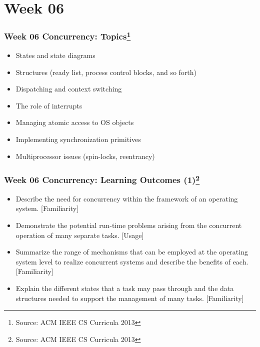 
\section{Week 06}
\begin{frame}[fragile]
\frametitle{Week 06 Concurrency:
Topics\footnote{Source: ACM IEEE CS Curricula 2013}}

\begin{itemize}
\item States and state diagrams 
\item Structures (ready list, process control blocks, and so forth) 
\item Dispatching and context switching 
\item The role of interrupts 
\item Managing atomic access to OS objects 
\item Implementing synchronization primitives 
\item Multiprocessor issues (spin-locks, reentrancy)  
\end{itemize}
\end{frame}

\begin{frame}[fragile]
\frametitle{Week 06 Concurrency:
Learning Outcomes (1)\footnote{Source: ACM IEEE CS Curricula 2013}}
\begin{itemize}
\item Describe the need for concurrency within the framework of an operating system. [Familiarity] 
\item Demonstrate the potential run-time problems arising from the concurrent operation of many separate tasks. [Usage] 
\item Summarize the range of mechanisms that can be employed at the operating system level to realize concurrent systems and describe the benefits of each. [Familiarity] 
\item Explain the different states that a task may pass through and the data structures needed to support the management of many tasks. [Familiarity] 
\end{itemize}
\end{frame}


